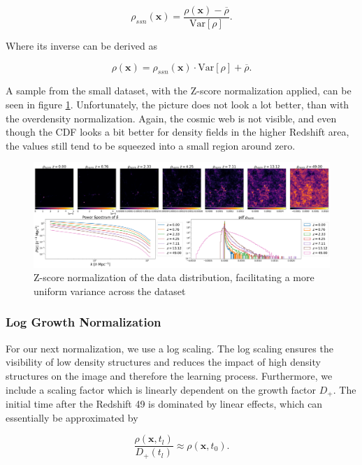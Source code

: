 \documentclass{article}
\begin{document}
\begin{equation}
    \rho_{ssn}(\mathbf{x}) = \frac{\rho(\mathbf{x}) - \overline{\rho}}{\mathrm{Var}[\rho]}.
\end{equation}

Where its inverse can be derived as

\begin{equation}
    \rho(\mathbf{x}) = \rho_{ssn}(\mathbf{x}) \cdot \mathrm{Var}[\rho] + \overline{\rho}.
\end{equation}

A sample from the small dataset, with the Z-score normalization applied, can be seen in figure \ref{fig:z-score}. Unfortunately, the picture does not look a lot better, than with the overdensity normalization. Again, the cosmic web is not visible, and even though the CDF looks a bit better for density fields in the higher Redshift area, the values still tend to be squeezed into a small region around zero.

\begin{figure}[h]
    \centering
    \includegraphics[width=1\linewidth]{img/ssm.png}
    \caption{Z-score normalization of the data distribution, facilitating a more uniform variance across the dataset}
    \label{fig:z-score}
\end{figure}

\subsubsection{Log Growth Normalization}

For our next normalization, we use a log scaling. The log scaling ensures the visibility of low density structures and reduces the impact of high density structures on the image and therefore the learning process. Furthermore, we include a scaling factor which is linearly dependent on the growth factor $D_+$. The initial time after the Redshift 49 is dominated by linear effects, which can essentially be approximated by

\begin{equation}
    \frac{\rho(\mathbf{x}, t_{l})}{D_+(t_l)} \approx \rho(\mathbf{x}, t_0).
\end{equation}
\end{document}

